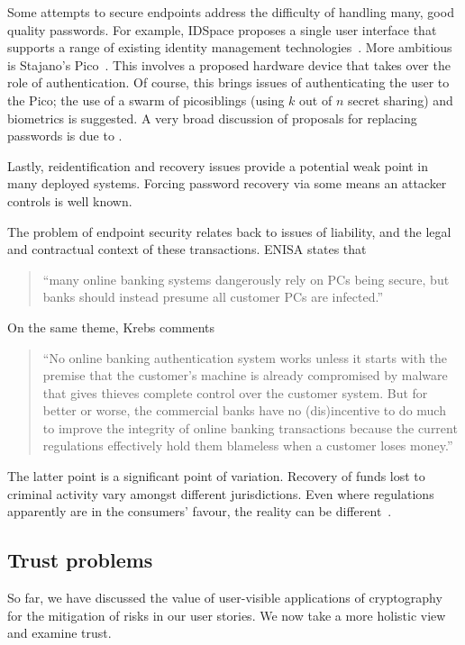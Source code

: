 \documentclass{article}
\def\citeN{\citet}
\def\cite{\citep}
\begin{document}
Some attempts to secure endpoints address the difficulty of handling many, good quality passwords.  
For example, IDSpace proposes a single user interface that supports a range of existing identity management technologies~\cite{Alsinani+12}.
More ambitious is Stajano's Pico~\cite{Stajano11}.  This involves a proposed hardware device that takes over the role of authentication.  Of course, this brings issues of authenticating the user to the Pico; the use of a swarm of picosiblings (using $k$ out of $n$ secret sharing) and biometrics is suggested.  A very broad discussion of proposals for replacing passwords is due to \citeN{Bonneau+12}.

Lastly, reidentification and recovery issues provide a potential weak point in many deployed systems.  Forcing password recovery via some means an attacker controls is well known.

The problem of endpoint security relates back to issues of liability, and the legal and contractual context of these transactions.
ENISA states that
\begin{quote}
  ``many online banking systems dangerously rely on PCs being secure,
  but banks should instead presume all customer PCs are
  infected.''~\cite{mENISA}
\end{quote}
On the same theme, Krebs comments
\begin{quote}
  ``No online banking authentication system works unless it starts
  with the premise that the customer’s machine is already compromised
  by malware that gives thieves complete control over the customer
  system. But for better or worse, the commercial banks have no
  (dis)incentive to do much to improve the integrity of online banking
  transactions because the current regulations effectively hold them
  blameless when a customer loses money.''~\cite{mKrebs}
\end{quote}
The latter point is a significant point of variation.  Recovery of funds lost to criminal activity vary amongst different jurisdictions.  Even where regulations apparently are in the consumers' favour, the reality can be different~\cite{mFIPR,mMason2}.


\subsection{Trust problems}\label{sec:trustRoots}

So far, we have discussed the value of user-visible applications of cryptography for
the mitigation of risks in our user stories.  We now take a more
holistic view and examine trust.
\end{document}
